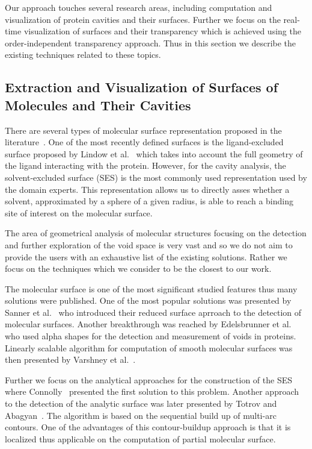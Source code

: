 Our approach touches several research areas, including computation and visualization of protein cavities and their surfaces. 
Further we focus on the real-time visualization of surfaces and their transparency which is achieved using the order-independent transparency approach. 
Thus in this section we describe the existing techniques related to these topics.

\subsection{Extraction and Visualization of Surfaces of Molecules and Their Cavities}
There are several types of molecular surface representation proposed in the literature~\cite{STAR2015}. 
One of the most recently defined surfaces is the ligand-excluded surface proposed by Lindow et al.~\cite{Lindow2014} which takes into account the full geometry of the ligand interacting with the protein.
However, for the cavity analysis, the solvent-excluded surface (SES) is the most commonly used representation used by the domain experts.%
This representation allows us to directly asses whether a solvent, approximated by a sphere of a given radius, is able to reach a binding site of interest on the molecular surface. 

The area of geometrical analysis of molecular structures focusing on the detection and further exploration of the void space is very vast and so we do not aim to provide the users with an exhaustive list of the existing solutions. 
Rather we focus on the techniques which we consider to be the closest to our work.

The molecular surface is one of the most significant studied features thus many solutions were published.
One of the most popular solutions was presented by Sanner et al.~\cite{Sanner1996} who introduced their reduced surface aprroach to the detection of molecular surfaces.
Another breakthrough was reached by Edelsbrunner et al.~\cite{Edelsbrunner1995} who used alpha shapes for the detection and measurement of voids in proteins.
Linearly scalable algorithm for computation of smooth molecular surfaces was then presented by Varshney et al.~\cite{Varshney1994}.

Further we focus on the analytical approaches for the construction of the SES where Connolly~\cite{connolly1983analytical} presented the first solution to this problem.
Another approach to the detection of the analytic surface was later presented by Totrov and Abagyan~\cite{totrov1996contour}.
The algorithm is based on the sequential build up of multi-arc contours. 
One of the advantages of this contour-buildup approach is that it is localized thus applicable on the computation of partial molecular surface.

